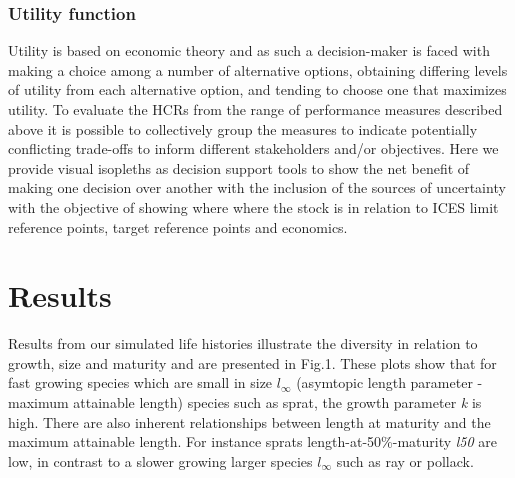 \documentclass[preprint,review,12pt]{elsarticle}
\begin{document}
  
\subsubsection{Utility function}
Utility is based on economic theory and as such a decision-maker is faced with making a choice among a number of alternative options, obtaining differing levels of utility from each alternative option, and tending to choose one that maximizes utility. To evaluate the HCRs from the range of performance measures described above it is possible to collectively group the measures to indicate potentially conflicting trade-offs to inform different stakeholders and/or objectives. Here we provide visual isopleths as decision support tools to show the net benefit of making one decision over another with the inclusion of the sources of uncertainty with the objective of showing where where the stock is in relation to ICES limit reference points, target reference points and economics.


\section{Results}

Results from our simulated life histories illustrate the diversity in relation to growth, size and maturity and are presented in Fig.1. These plots show that for fast growing species which are small in size $l_{\infty}$ (asymtopic length parameter - maximum attainable length) species such as sprat, the growth parameter \textit{k} is high. There are also inherent relationships between length at maturity and the maximum attainable length. For instance sprats length-at-50\%-maturity \textit{l50} are low, in contrast to a slower growing larger species $l_{\infty}$ such as ray or pollack.
\end{document}
